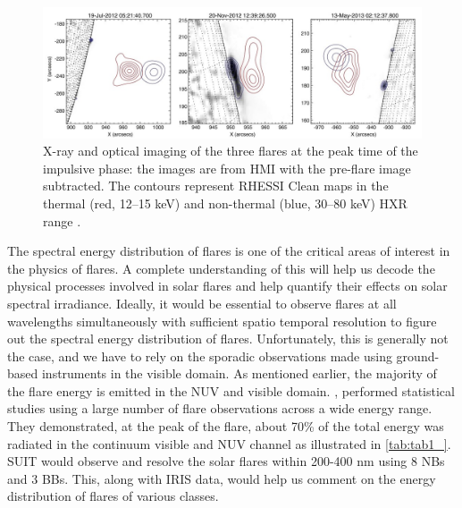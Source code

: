 \begin{figure}[ht!]
    \centering
    \includegraphics[width = \linewidth]{Figures/Krucker_2015_ApJ_802_19_page-0004.jpg}
    \caption[X-ray and optical imaging of the three flares at the peak of the flare.]{X-ray and optical imaging of the three flares at the peak time of the impulsive phase: the images are from HMI with the pre-flare image subtracted. The contours represent RHESSI Clean maps in the thermal (red, 12–15 keV) and non-thermal (blue, 30–80 keV) HXR range \citep{krucker15}.}
    \label{fig1}
\end{figure}

The spectral energy distribution of flares is one of the critical areas of interest in the physics of flares. A complete understanding of this will help us decode the physical processes involved in solar flares and help quantify their effects on solar spectral irradiance. Ideally, it would be essential to observe flares at all wavelengths simultaneously with sufficient spatio temporal resolution to figure out the spectral energy distribution of flares. Unfortunately, this is generally not the case, and we have to rely on the sporadic observations made using ground-based instruments in the visible domain. As mentioned earlier, the majority of the flare energy is emitted in the NUV and visible domain. \cite{kretzschmar10,kretzschmar11}, performed statistical studies using a large number of flare observations across a wide energy range. They demonstrated, at the peak of the flare, about 70\% of the total energy was radiated in the continuum visible and NUV channel as illustrated in \ref{tab:tab1_}. SUIT would observe and resolve the solar flares within 200-400 nm using 8 NBs and 3 BBs. This, along with IRIS data, would help us comment on the energy distribution of flares of various classes.

